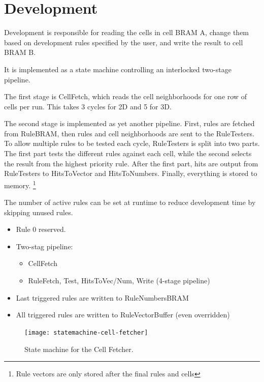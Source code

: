 
\section{Development}

Development is responsible for reading the cells in cell BRAM A, change them based on development rules specified by the user, and write the result to cell BRAM B.

It is implemented as a state machine controlling an interlocked two-stage pipeline.

The first stage is CellFetch, which reads the cell neighborhoods for one row of cells per run.
This takes 3 cycles for 2D and 5 for 3D.

The second stage is implemented as yet another pipeline.
First, rules are fetched from RuleBRAM, then rules and cell neighborhoods are sent to the RuleTesters.
To allow multiple rules to be tested each cycle, RuleTesters is split into two parts.
The first part tests the different rules against each cell, while the second selects the result from the highest priority rule.
After the first part, hits are output from RuleTesters to HitsToVector and HitsToNumbers.
Finally, everything is stored to memory.
\footnote{Rule vectors are only stored after the final rules and cells}

The number of active rules can be set at runtime to reduce development time by skipping unused rules.
\TODO
{}

\begin{itemize}
    \item Rule 0 reserved.
    \item Two-stag pipeline:
    \begin{itemize}
        \item CellFetch
        \item RuleFetch, Test, HitsToVec/Num, Write (4-stage pipeline)
    \end{itemize}
    \item Last triggered rules are written to RuleNumbersBRAM
    \item All triggered rules are written to RuleVectorBuffer (even overridden)
\end{itemize}

\begin{figure}[!ht]
    \centering
    \texttt{[image: statemachine-cell-fetcher]}
    \caption[Cell Fetcher state machine]{
        State machine for the Cell Fetcher.
    }
    \label{fig:implementation-cell-fetcher}
\end{figure}

